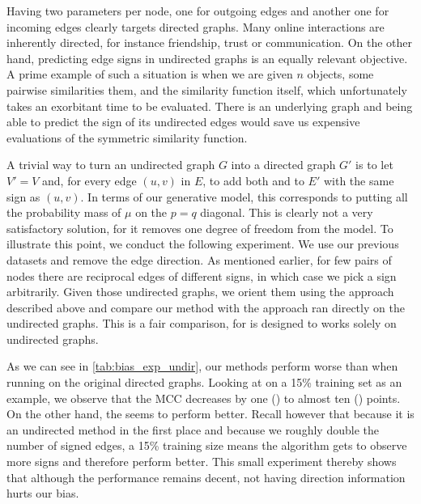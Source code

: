 Having two parameters per node, one for outgoing edges and another one for incoming edges clearly
targets directed graphs. Many online interactions are inherently directed, for instance friendship,
trust or communication. On the other hand, predicting edge signs in undirected graphs is an equally
relevant objective. A prime example of such a situation is when we are given $n$ objects, some
pairwise similarities them, and the similarity function itself, which unfortunately takes an
exorbitant time to be evaluated. There is an underlying graph and being able to predict the sign of
its undirected edges would save us expensive evaluations of the symmetric similarity function.

A trivial way to turn an undirected graph $G$ into a directed graph $G'$ is to let $V'=V$ and, for
every edge $(u,v)$ in $E$, to add both \euv{} and \evu{} to $E'$ with the same sign as $(u,v)$. In
terms of our generative model, this corresponds to putting all the probability mass of $\mu$ on the
$p=q$ diagonal. This is clearly not a very satisfactory solution, for it removes one degree of
freedom from the model. To illustrate this point, we conduct the following experiment. We use our
previous \dssn{} datasets and remove the edge direction. As mentioned earlier, for few pairs of
nodes there are reciprocal edges of different signs, in which case we pick a sign arbitrarily. Given
those undirected graphs, we orient them using the approach described above and compare our method
with the \complowrank{} approach ran directly on the undirected graphs. This is a fair comparison,
for \complowrank{} is designed to works solely on undirected graphs.

As we can see in \autoref{tab:bias_exp_undir}, our methods perform worse than when running on the
original directed graphs. Looking at \uslpropGsec{} on a 15\% training set as an example, we observe
that the MCC decreases by one (\kiw{}) to almost ten (\epi{}) points. On the other hand, the
\complowrank{} seems to perform better. Recall however that because it is an undirected method in
the first place and because we roughly double the number of signed edges, a 15\% training size means
the algorithm gets to observe more signs and therefore perform better. This small experiment thereby
shows that although the performance remains decent, not having direction information hurts our bias.


